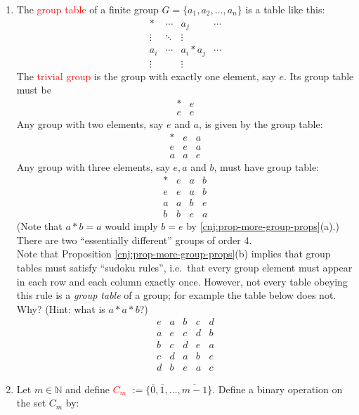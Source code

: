 \documentclass[
  12pt,
  a4paper,
  twoside]{article}
\theoremstyle{plain}
\theoremstyle{definition}
\begin{document}
\begin{enumerate}
\def\labelenumi{(\alph{enumi})}
\item
  The \textcolor{red}{group table} of a finite group \(G=\{a_1,a_2,\dots,a_n\}\) is a table like this:
  \[
  \begin{array}{c|ccc}
  \ast & \cdots & a_j & \cdots \\
  \hline
  \vdots & \ddots & \vdots & \\
  a_i & \cdots & a_i*a_j & \cdots\\
  \vdots &  & \vdots & 
  \end{array}
  \]
  The \textcolor{red}{trivial group} is the group with exactly one element, say \(e\). Its group table must be
  \[
  \begin{array}{c|c} * & e \\ \hline e & e\end{array}
  \]
  Any group with two elements, say \(e\) and \(a\), is given by the group table:
  \[
  \begin{array}{c|cc} * & e & a \\ \hline e & e & a \\ a & a & e\end{array}
  \]
  Any group with three elements, say \(e, a\) and \(b\), must have group table:
  \[
  \begin{array}{c|ccc} * & e & a & b \\ \hline e & e & a & b \\
  a & a & b & e \\ b & b & e & a\end{array}
  \]
  (Note that \(a*b=a\) would imply \(b=e\) by \ref{cnj:prop-more-group-props}(a).) There are two ``essentially different'' groups of order 4.\\
  Note that Proposition \ref{cnj:prop-more-group-props}(b) implies that group tables must satisfy ``sudoku rules'', i.e.~that every group element must appear in each row and each column exactly once. However, not every table obeying this rule is a \emph{group table} of a group; for example the table below does not. Why? (Hint: what is \(a*a*b\)?)
  \[
  \begin{array}{ccccc}
  e&a&b&c&d\\
  a&e&c&d&b\\
  b&c&d&e&a\\
  c&d&a&b&e\\
  d&b&e&a&c
  \end{array}
  \]
\item
  Let \(m\in\mathbb{N}\) and define \textcolor{red}{$C_m$} \(:=\{\overline{0},\overline{1},\dots,\overline{m-1}\}\). Define a binary operation on the set \(C_m\) by:

\end{enumerate}
\end{document}

